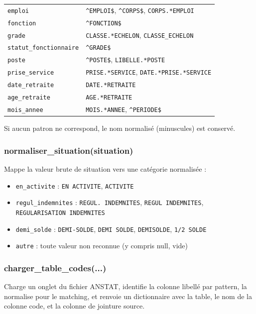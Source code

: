 \documentclass[12pt,a4paper,french]{report}
\begin{document}
\begin{longtable}{lp{7.5cm}}
  \texttt{emploi} & \texttt{\^{}EMPLOI\$}, \texttt{\^{}CORPS\$},
    \texttt{CORPS.*EMPLOI} \\
  \texttt{fonction} & \texttt{\^{}FONCTION\$} \\
  \texttt{grade} & \texttt{CLASSE.*ECHELON}, \texttt{CLASSE\_ECHELON} \\
  \texttt{statut\_fonctionnaire} & \texttt{\^{}GRADE\$} \\
  \texttt{poste} & \texttt{\^{}POSTE\$}, \texttt{LIBELLE.*POSTE} \\
  \texttt{prise\_service} & \texttt{PRISE.*SERVICE},
    \texttt{DATE.*PRISE.*SERVICE} \\
  \texttt{date\_retraite} & \texttt{DATE.*RETRAITE} \\
  \texttt{age\_retraite} & \texttt{AGE.*RETRAITE} \\
  \texttt{mois\_annee} & \texttt{MOIS.*ANNEE}, \texttt{\^{}PERIODE\$} \\
  \bottomrule
\end{longtable}

Si aucun patron ne correspond, le nom normalisé (minuscules) est conservé.

\subsubsection{normaliser\_situation(situation)}

Mappe la valeur brute de situation vers une catégorie normalisée :
\begin{itemize}[nosep]
  \item \texttt{en\_activite} : \texttt{EN ACTIVITE}, \texttt{ACTIVITE}
  \item \texttt{regul\_indemnites} : \texttt{REGUL. INDEMNITES},
        \texttt{REGUL INDEMNITES}, \texttt{REGULARISATION INDEMNITES}
  \item \texttt{demi\_solde} : \texttt{DEMI-SOLDE}, \texttt{DEMI SOLDE},
        \texttt{DEMISOLDE}, \texttt{1/2 SOLDE}
  \item \texttt{autre} : toute valeur non reconnue (y compris null, vide)
\end{itemize}

\subsubsection{charger\_table\_codes(...)}

Charge un onglet du fichier ANSTAT, identifie la colonne libellé par pattern,
la normalise pour le matching, et renvoie un dictionnaire avec la table,
le nom de la colonne code, et la colonne de jointure source.
\end{document}
